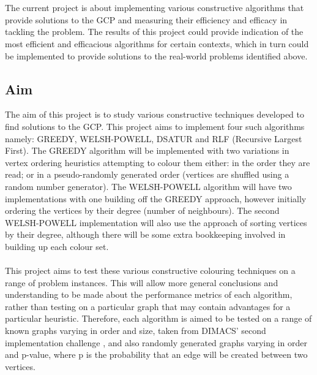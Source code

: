 \\\\
The current project is about implementing various constructive algorithms that provide solutions to the GCP and measuring their efficiency and efficacy in tackling the problem. The results of this project could provide indication of the most efficient and efficacious algorithms for certain contexts, which in turn could be implemented to provide solutions to the real-world problems identified above. 

\subsection{Aim}
The aim of this project is to study various constructive techniques developed to find solutions to the GCP. This project aims to implement four such algorithms namely: GREEDY, WELSH-POWELL, DSATUR and RLF (Recursive Largest First). The GREEDY algorithm will be implemented with two variations in vertex ordering heuristics attempting to colour them either: in the order they are read; or in a pseudo-randomly generated order (vertices are shuffled using a random number generator). The WELSH-POWELL algorithm will have two implementations with one building off the GREEDY approach, however initially ordering the vertices by their degree (number of neighbours). The second WELSH-POWELL implementation will also use the approach of sorting vertices by their degree, although there will be some extra bookkeeping involved in building up each colour set. 
\\\\
This project aims to test these various constructive colouring techniques on a range of problem instances. This will allow more general conclusions and understanding to be made about the performance metrics of each algorithm, rather than testing on a particular graph that may contain advantages for a particular heuristic. Therefore, each algorithm is aimed to be tested on a range of known graphs varying in order and size, taken from DIMACS’ second implementation challenge \cite{DIMACSChallenge2}, and also randomly generated graphs varying in order and p-value, where p is the probability that an edge will be created between two vertices. 
\\\\
